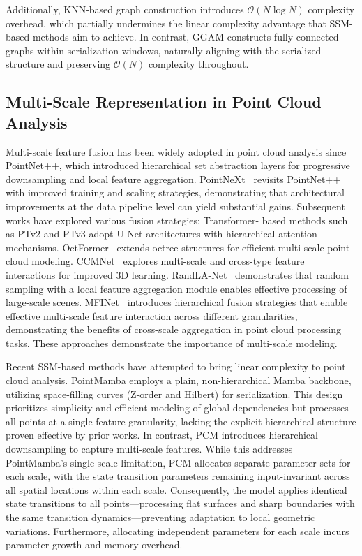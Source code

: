 \documentclass[a4paper,fleqn]{cas-sc}
\begin{document}
Additionally, KNN-based graph construction introduces $\mathcal{O}(N\log N)$ complexity overhead, which partially undermines the linear complexity advantage that SSM-based methods aim to achieve. In contrast, GGAM constructs fully connected graphs within serialization windows, naturally aligning with the serialized structure and preserving $\mathcal{O}(N)$ complexity throughout.


\subsection{Multi-Scale Representation in Point Cloud Analysis}

Multi-scale feature fusion has been widely adopted in point cloud analysis since PointNet++\cite{PointNet++}, which introduced hierarchical set abstraction
layers for progressive downsampling and local feature aggregation. PointNeXt~\cite{pointnext} revisits PointNet++ with improved training and scaling strategies, demonstrating that architectural improvements at the data pipeline level can yield substantial gains. Subsequent
works have explored various fusion strategies: Transformer-
based methods such as PTv2 \cite{ptv2} and PTv3 \cite{ptv3} adopt U-Net
architectures with hierarchical attention mechanisms. OctFormer~\cite{octformer2} extends octree structures for efficient multi-scale point cloud modeling. CCMNet~\cite{ccmnet} explores multi-scale and cross-type feature interactions for improved 3D learning. RandLA-Net~\cite{Randla} demonstrates that random sampling with a local feature aggregation module enables effective processing of large-scale scenes. MFINet~\cite{MFINet} introduces hierarchical fusion strategies that enable effective multi-scale feature interaction across different granularities, demonstrating the benefits of cross-scale aggregation in point cloud processing tasks. These approaches
demonstrate the importance of multi-scale modeling.

Recent SSM-based methods have attempted to bring linear complexity to point
cloud analysis. PointMamba \cite{PointMamba} employs a plain, non-hierarchical
Mamba backbone, utilizing space-filling curves (Z-order and Hilbert) for
serialization. This design prioritizes
simplicity and efficient modeling of global dependencies but processes all points at a single
feature granularity, lacking the explicit hierarchical structure proven
effective by prior works. In contrast, PCM \cite{pcm} introduces hierarchical
downsampling to capture multi-scale features. While this addresses PointMamba's
single-scale limitation, PCM allocates separate parameter sets for each scale,
with the state transition parameters remaining input-invariant across all
spatial locations within each scale. Consequently, the model applies identical
state transitions to all points—processing flat surfaces and sharp boundaries
with the same transition dynamics—preventing adaptation to local geometric
variations. Furthermore, allocating independent parameters for each scale
incurs parameter growth and memory overhead.
\end{document}
